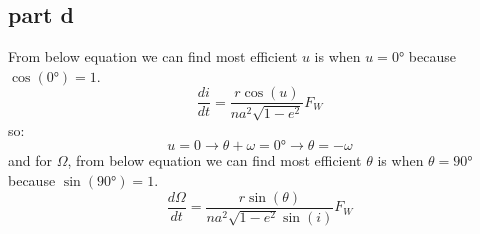 \subsection{part d}

From below equation we can find most efficient $u$ is when $u = \ang{0}$ because $\cos(\ang{0}) = 1$.
\begin{equation}
    \dfrac{di}{dt} = \dfrac{r\cos(u)}{na^2\sqrt{1-e^2}}F_W
\end{equation}
so:
$$
u = 0 \to \theta + \omega = \ang{0} \to \theta = -\omega
$$
and for $\Omega$, from below equation we can find most efficient $\theta$ is when $\theta = \ang{90}$ because $\sin(\ang{90}) = 1$.
$$
\dfrac{d\Omega}{dt} = \dfrac{r\sin(\theta)}{na^2\sqrt{1-e^2}\sin(i)}F_W 
$$